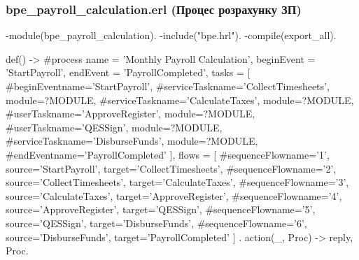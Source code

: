 \documentclass{article}
\let\originalfootnotesize\footnotesize
\let\oldverbatim\verbatim
\let\oldendverbatim\endverbatim
\renewenvironment{verbatim}{\originalfootnotesize\oldverbatim}{\oldendverbatim}
\begin{document}
\subsubsection{bpe\_payroll\_calculation.erl (Процес розрахунку ЗП)}
\begin{verbatim}
-module(bpe_payroll_calculation).
-include("bpe.hrl").
-compile(export_all).

def() ->
    #process{
        name = 'Monthly Payroll Calculation',
        beginEvent = 'StartPayroll',
        endEvent = 'PayrollCompleted',
        tasks = [
            #beginEvent{name='StartPayroll'},
            #serviceTask{name='CollectTimesheets', module=?MODULE},
            #serviceTask{name='CalculateTaxes', module=?MODULE},
            #userTask{name='ApproveRegister', module=?MODULE},
            #userTask{name='QESSign', module=?MODULE},
            #serviceTask{name='DisburseFunds', module=?MODULE},
            #endEvent{name='PayrollCompleted'}
        ],
        flows = [
            #sequenceFlow{name='1', source='StartPayroll', 
                         target='CollectTimesheets'},
            #sequenceFlow{name='2', source='CollectTimesheets', 
                         target='CalculateTaxes'},
            #sequenceFlow{name='3', source='CalculateTaxes', 
                         target='ApproveRegister'},
            #sequenceFlow{name='4', source='ApproveRegister', 
                         target='QESSign'},
            #sequenceFlow{name='5', source='QESSign', 
                         target='DisburseFunds'},
            #sequenceFlow{name='6', source='DisburseFunds', 
                         target='PayrollCompleted'}
        ]
    }.
action(_, Proc) -> {reply, Proc}.
\end{verbatim}
\end{document}
